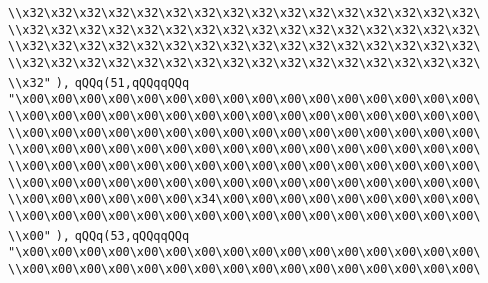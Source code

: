 \verb|\\x32\x32\x32\x32\x32\x32\x32\x32\x32\x32\x32\x32\x32\x32\x32\x32\|\newline
\verb|\\x32\x32\x32\x32\x32\x32\x32\x32\x32\x32\x32\x32\x32\x32\x32\x32\|\newline
\verb|\\x32\x32\x32\x32\x32\x32\x32\x32\x32\x32\x32\x32\x32\x32\x32\x32\|\newline
\verb|\\x32\x32\x32\x32\x32\x32\x32\x32\x32\x32\x32\x32\x32\x32\x32\x32\|\newline
\verb|\\x32"|\newline
\verb|),|\newline
\verb|qQQq(51,qQQqqQQq|\newline
\verb|"\x00\x00\x00\x00\x00\x00\x00\x00\x00\x00\x00\x00\x00\x00\x00\x00\|\newline
\verb|\\x00\x00\x00\x00\x00\x00\x00\x00\x00\x00\x00\x00\x00\x00\x00\x00\|\newline
\verb|\\x00\x00\x00\x00\x00\x00\x00\x00\x00\x00\x00\x00\x00\x00\x00\x00\|\newline
\verb|\\x00\x00\x00\x00\x00\x00\x00\x00\x00\x00\x00\x00\x00\x00\x00\x00\|\newline
\verb|\\x00\x00\x00\x00\x00\x00\x00\x00\x00\x00\x00\x00\x00\x00\x00\x00\|\newline
\verb|\\x00\x00\x00\x00\x00\x00\x00\x00\x00\x00\x00\x00\x00\x00\x00\x00\|\newline
\verb|\\x00\x00\x00\x00\x00\x00\x34\x00\x00\x00\x00\x00\x00\x00\x00\x00\|\newline
\verb|\\x00\x00\x00\x00\x00\x00\x00\x00\x00\x00\x00\x00\x00\x00\x00\x00\|\newline
\verb|\\x00"|\newline
\verb|),|\newline
\verb|qQQq(53,qQQqqQQq|\newline
\verb|"\x00\x00\x00\x00\x00\x00\x00\x00\x00\x00\x00\x00\x00\x00\x00\x00\|\newline
\verb|\\x00\x00\x00\x00\x00\x00\x00\x00\x00\x00\x00\x00\x00\x00\x00\x00\|\newline
